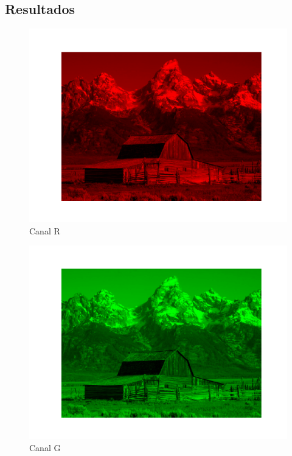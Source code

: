 \documentclass[a4paper, 12pt]{article}
\begin{document}
    \subsection{Resultados}
        \begin{multicols}{3}
            \begin{figure}[H]
                \includegraphics[width=\linewidth]{resources/Exercicio4/R.png}
                \caption{\label{fig:my_label} Canal R}
            \end{figure}
            \begin{figure}[H]
                \includegraphics[width=\linewidth]{resources/Exercicio4/G.png}
                \caption{\label{fig:my_label} Canal G}
            \end{figure}

\end{multicols}
\end{document}
